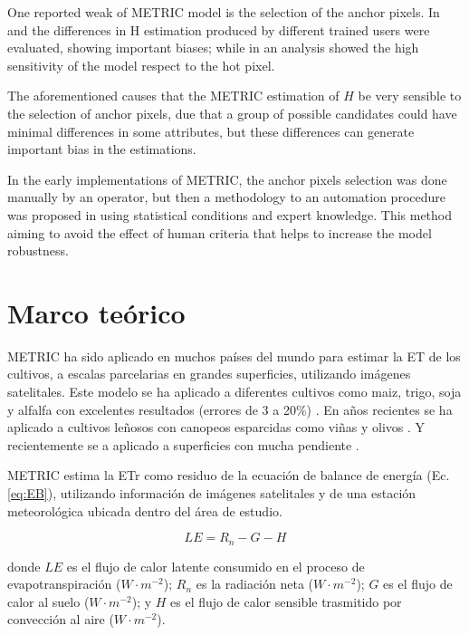 \documentclass[]{article}
\begin{document}
One reported weak of METRIC model is the selection of the anchor pixels. In \cite{long2013assessing} and \cite{mortonassessing} the differences in H estimation produced by different trained users were evaluated, showing important biases; while in \cite{choragudi2011sensitivity, wang2009sensitivity} an analysis showed the high sensitivity of the model respect to the hot pixel.

The aforementioned causes that the METRIC estimation of $H$ be very sensible to the selection of anchor pixels, due that a group of possible candidates could have minimal differences in some attributes, but these differences can generate important bias in the estimations.

In the early implementations of METRIC, the anchor pixels selection was done manually by an operator, but then a methodology to an automation procedure  was proposed in \cite{allenautomated2013} using statistical conditions and expert knowledge. This method  aiming to avoid the effect of human criteria that helps to increase the model robustness.

\section{Marco teórico}

METRIC ha sido aplicado en muchos países del mundo para estimar la ET de los cultivos, a escalas parcelarias en grandes superficies, utilizando imágenes satelitales. Este modelo se ha aplicado a diferentes cultivos como maiz, trigo, soja y alfalfa con excelentes resultados (errores de 3 a 20\%) \citep{Allen2007b, Choi2009, Mkhwanazi2012}. En años recientes se ha aplicado a cultivos leñosos con canopeos esparcidas como viñas y olivos \citep{Poblete-Echeverria2012, Carrasco-Benavides2014, Santos2012, Pocas2014}. Y recientemente se a aplicado a superficies con mucha pendiente \citep{Allen2013}.

METRIC estima la ETr como residuo de la ecuación de balance de energía (Ec. \ref{eq:EB}), utilizando información de imágenes satelitales y de una estación meteorológica ubicada dentro del área de estudio. 

\begin{equation}
\label{eq:EB}
LE = R_n - G - H
\end{equation}

donde $LE$ es el flujo de calor latente consumido en el proceso de evapotranspiración ($W \cdot m^{-2}$); $R_n$ es la radiación neta ($W \cdot m^{-2}$); $G$ es el flujo de calor al suelo ($W \cdot m^{-2}$); y $H$ es el flujo de calor sensible trasmitido por convección al aire ($W \cdot m^{-2}$).
\end{document}
